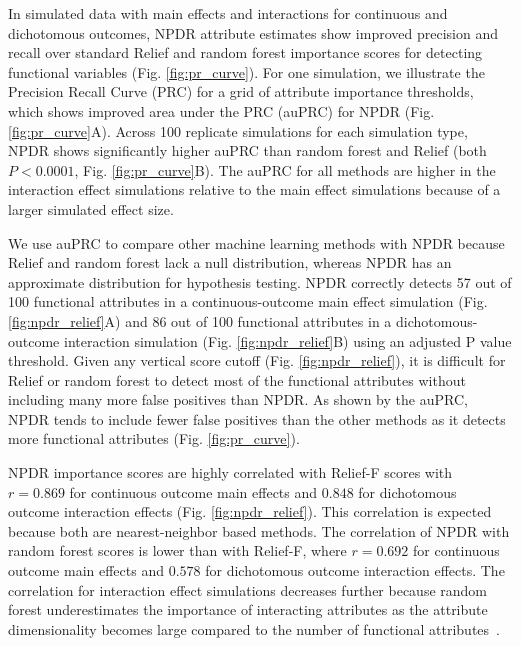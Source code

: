 \documentclass[10pt]{article}
\begin{document}
In simulated data with main effects and interactions for continuous and dichotomous outcomes, NPDR attribute estimates show improved precision and recall over standard Relief and random forest importance scores for detecting functional variables (Fig. \ref{fig:pr_curve}).
For one simulation, we illustrate the Precision Recall Curve (PRC) for a grid of attribute importance thresholds, which shows improved area under the PRC (auPRC) for NPDR (Fig. \ref{fig:pr_curve}A).
Across 100 replicate simulations for each simulation type, NPDR shows significantly higher auPRC than random forest and Relief (both $P < 0.0001$, Fig. \ref{fig:pr_curve}B).
The auPRC for all methods are higher in the interaction effect simulations relative to the main effect simulations because of a larger simulated effect size.

We use auPRC to compare other machine learning methods with NPDR because Relief and random forest lack a null distribution, whereas NPDR has an approximate distribution for hypothesis testing.
NPDR correctly detects 57 out of 100 functional attributes in a continuous-outcome main effect simulation (Fig. \ref{fig:npdr_relief}A) and 86 out of 100 functional attributes in a dichotomous-outcome interaction simulation (Fig. \ref{fig:npdr_relief}B) using an adjusted P value threshold.
Given any vertical score cutoff (Fig. \ref{fig:npdr_relief}), it is difficult for Relief or random forest to detect most of the functional attributes without including many more false positives than NPDR.
As shown by the auPRC, NPDR tends to include fewer false positives than the other methods as it detects more functional attributes (Fig. \ref{fig:pr_curve}).

NPDR importance scores are highly correlated with Relief-F scores with $r = 0.869$ for continuous outcome main effects and $0.848$ for dichotomous outcome interaction effects (Fig. \ref{fig:npdr_relief}).
This correlation is expected because both are nearest-neighbor based methods.
The correlation of NPDR with random forest scores is lower than with Relief-F, where $r = 0.692$ for continuous outcome main effects and $0.578$ for dichotomous outcome interaction effects.
The correlation for interaction effect simulations decreases further because random forest underestimates the importance of interacting attributes as the attribute dimensionality becomes large compared to the number of functional attributes~\cite{mckinney2009capturing,winham2012snp}.
\end{document}
